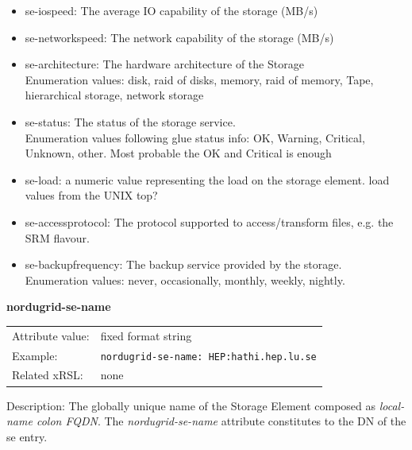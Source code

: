\documentclass{article}
\begin{document}
\begin{itemize}
\item se-iospeed: The average IO capability of the storage (MB/s) 

\item se-networkspeed: The network capability of the storage (MB/s)

\item se-architecture: The hardware architecture of the Storage \\
Enumeration values: disk, raid of disks, memory, raid of memory,
Tape, hierarchical storage, network storage

\item se-status: The status of the storage service. \\
Enumeration values following glue status info: OK, Warning, Critical, Unknown,
other. Most probable the OK and Critical is enough

\item se-load: a numeric value representing the load on the storage element.
load values from the UNIX top?

\item se-accessprotocol: The protocol supported to access/transform files, e.g. the SRM flavour. 

\item se-backupfrequency: The backup service provided by the storage. \\
Enumeration values: never, occasionally, monthly, weekly, nightly.

\end{itemize}


  \hspace*{0.5cm}
  \begin{shaded}
    \textbf{nordugrid-se-name}
  \end{shaded}
  \begin{tabular}{lp{10cm}}  
    Attribute value:& fixed format string\\
    Example:& \verb#nordugrid-se-name: HEP:hathi.hep.lu.se#\\    
    Related xRSL:& none\\
  \end{tabular}

Description: The globally unique name of the Storage Element
composed as {\it local-name colon  FQDN}.
The {\it nordugrid-se-name} attribute constitutes to the DN of the se entry.
\end{document}
